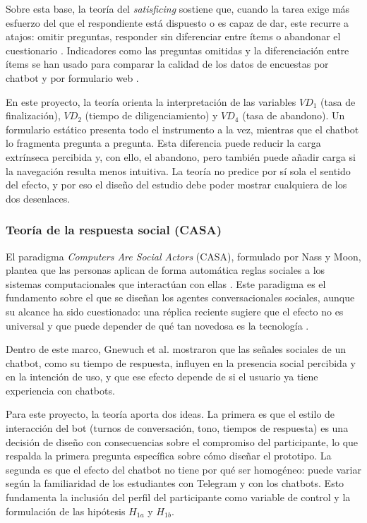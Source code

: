 \documentclass[12pt,letterpaper]{article}
\begin{document}
Sobre esta base, la teoría del \textit{satisficing} sostiene que, cuando la tarea exige más esfuerzo del que el respondiente está dispuesto o es capaz de dar, este recurre a atajos: omitir preguntas, responder sin diferenciar entre ítems o abandonar el cuestionario \cite{krosnick1991}. Indicadores como las preguntas omitidas y la diferenciación entre ítems se han usado para comparar la calidad de los datos de encuestas por chatbot y por formulario web \cite{beam2023}.

En este proyecto, la teoría orienta la interpretación de las variables $VD_1$ (tasa de finalización), $VD_2$ (tiempo de diligenciamiento) y $VD_4$ (tasa de abandono). Un formulario estático presenta todo el instrumento a la vez, mientras que el chatbot lo fragmenta pregunta a pregunta. Esta diferencia puede reducir la carga extrínseca percibida y, con ello, el abandono, pero también puede añadir carga si la navegación resulta menos intuitiva. La teoría no predice por sí sola el sentido del efecto, y por eso el diseño del estudio debe poder mostrar cualquiera de los dos desenlaces.

\subsubsection{Teoría de la respuesta social (CASA)}

El paradigma \textit{Computers Are Social Actors} (CASA), formulado por Nass y Moon, plantea que las personas aplican de forma automática reglas sociales a los sistemas computacionales que interactúan con ellas \cite{nass2000}. Este paradigma es el fundamento sobre el que se diseñan los agentes conversacionales sociales, aunque su alcance ha sido cuestionado: una réplica reciente sugiere que el efecto no es universal y que puede depender de qué tan novedosa es la tecnología \cite{heyselaar2023}.

Dentro de este marco, Gnewuch et al. \cite{gnewuch2022} mostraron que las señales sociales de un chatbot, como su tiempo de respuesta, influyen en la presencia social percibida y en la intención de uso, y que ese efecto depende de si el usuario ya tiene experiencia con chatbots.

Para este proyecto, la teoría aporta dos ideas. La primera es que el estilo de interacción del bot (turnos de conversación, tono, tiempos de respuesta) es una decisión de diseño con consecuencias sobre el compromiso del participante, lo que respalda la primera pregunta específica sobre cómo diseñar el prototipo. La segunda es que el efecto del chatbot no tiene por qué ser homogéneo: puede variar según la familiaridad de los estudiantes con Telegram y con los chatbots. Esto fundamenta la inclusión del perfil del participante como variable de control y la formulación de las hipótesis $H_{1a}$ y $H_{1b}$.
\end{document}
